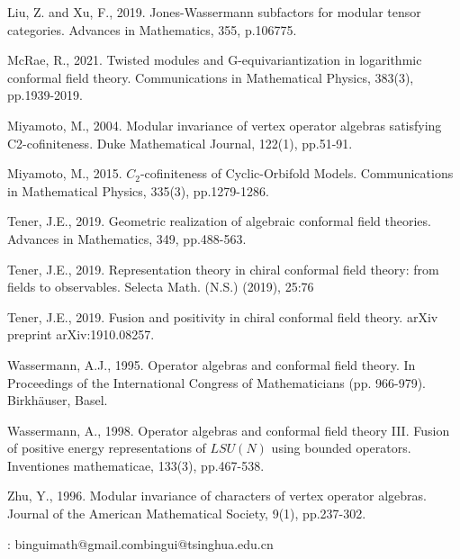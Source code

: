\documentclass[11pt,b5paper,notitlepage]{article}
\theoremstyle{definition}
\theoremstyle{plain}
\numberwithin{equation}{subsection}
\begin{document}
\begin{thebibliography}{999999}
Liu, Z. and Xu, F., 2019. Jones-Wassermann subfactors for modular tensor categories. Advances in Mathematics, 355, p.106775.	


McRae, R., 2021. Twisted modules and G-equivariantization in logarithmic conformal field theory. Communications in Mathematical Physics, 383(3), pp.1939-2019.

Miyamoto, M., 2004. Modular invariance of vertex operator algebras satisfying C2-cofiniteness. Duke Mathematical Journal, 122(1), pp.51-91.

Miyamoto, M., 2015. $C_2$-cofiniteness of Cyclic-Orbifold Models. Communications in Mathematical Physics, 335(3), pp.1279-1286.



Tener, J.E., 2019. Geometric realization of algebraic conformal field theories. Advances in Mathematics, 349, pp.488-563.


Tener, J.E., 2019. Representation theory in chiral conformal field theory: from fields to
observables. Selecta Math. (N.S.) (2019), 25:76

Tener, J.E., 2019. Fusion and positivity in chiral conformal field theory. arXiv preprint arXiv:1910.08257.


Wassermann, A.J., 1995. Operator algebras and conformal field theory. In Proceedings of the International Congress of Mathematicians (pp. 966-979). Birkhäuser, Basel.


Wassermann, A., 1998. Operator algebras and conformal field theory III. Fusion of positive energy representations of $LSU(N)$ using bounded operators. Inventiones mathematicae, 133(3), pp.467-538.


Zhu, Y., 1996. Modular invariance of characters of vertex operator algebras. Journal of the American Mathematical Society, 9(1), pp.237-302.	
		
		
\end{thebibliography}


: binguimath@gmail.com\qquad bingui@tsinghua.edu.cn
\end{document}
